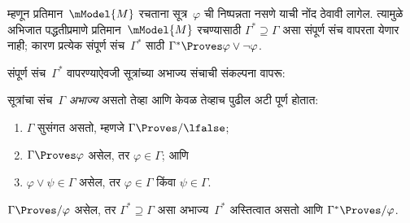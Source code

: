 म्हणून प्रतिमान~$\mModel{M}$ रचताना
सूत्र~$\varphi$ ची निष्पन्नता नसणे
याची नोंद ठेवावी लागेल. त्यामुळे अभिजात
पद्धतीप्रमाणे प्रतिमान~$\mModel{M}$
रचण्यासाठी $\Gamma^* \supseteq \Gamma$
असा संपूर्ण संच वापरता येणार नाही;
कारण प्रत्येक संपूर्ण संच~$\Gamma^*$ साठी
$\Gamma^* \Proves \varphi \lor \lnot \varphi$.

संपूर्ण संच~$\Gamma^*$ वापरण्याऐवजी
सूत्रांच्या अभाज्य संचाची संकल्पना वापरू:

\begin{defn}\label{int:sc:lin:defn:prime}
  सूत्रांचा संच~$\Gamma$
  \emph{अभाज्य} असतो तेव्हा आणि केवळ तेव्हाच
  पुढील अटी पूर्ण होतात:
  \begin{enumerate}
  \item\label{int:sc:lin:defn:prime1} $\Gamma$ सुसंगत असतो,
    म्हणजे $\Gamma \Proves/ \lfalse$;
  \item\label{int:sc:lin:defn:prime2} $\Gamma \Proves \varphi$
    असेल, तर $\varphi \in \Gamma$; आणि
  \item\label{int:sc:lin:defn:prime3} $\varphi \lor \psi \in \Gamma$
    असेल, तर $\varphi \in \Gamma$ किंवा
    $\psi \in \Gamma$.
  \end{enumerate}
\end{defn}

\begin{lem}[लिंडेनबाउमचे पूर्वप्रमेय]
  \label{int:sc:lin:lem:lindenbaum}
  $\Gamma \Proves/ \varphi$ असेल, तर
  $\Gamma^* \supseteq \Gamma$ असा
  अभाज्य~$\Gamma^*$ अस्तित्वात असतो
  आणि $\Gamma^* \Proves/ \varphi$.
\end{lem}

